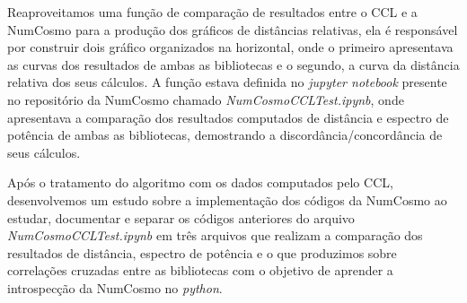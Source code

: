 Reaproveitamos uma função de comparação de resultados entre o CCL e a NumCosmo para a produção dos gráficos de distâncias relativas, ela é responsável por construir dois gráfico organizados na horizontal, onde o primeiro apresentava as curvas dos resultados de ambas as bibliotecas e o segundo, a curva da distância relativa dos seus cálculos. A função estava definida no \textit{jupyter notebook} presente no repositório da NumCosmo chamado \textit{NumCosmoCCLTest.ipynb}, onde apresentava a comparação dos resultados computados de distância e espectro de potência de ambas as bibliotecas, demostrando a discordância/concordância de seus cálculos.

Após o tratamento do algoritmo com os dados computados pelo CCL, desenvolvemos um estudo sobre a implementação dos códigos da NumCosmo ao estudar, documentar e separar os códigos anteriores do arquivo \textit{NumCosmoCCLTest.ipynb} em três arquivos que realizam a comparação dos resultados de distância, espectro de potência e o que produzimos sobre correlações cruzadas entre as bibliotecas com o objetivo de aprender a introspecção da NumCosmo no \textit{python}.










